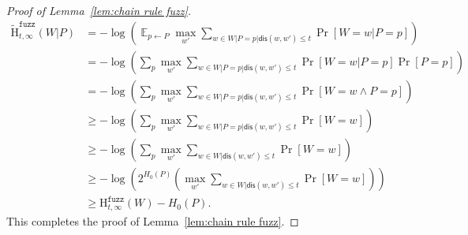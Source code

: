 \documentclass[11pt]{article}
\newcommand{\lemref}[1]{\mbox{Lemma~\ref{#1}}}
\DeclareMathOperator*{\expe}{\mathbb{E}}
\newcommand{\dis}{\ensuremath{\mathsf{dis}}}
\newcommand{\Hfuzz}{\mathrm{H}^{\mathtt{fuzz}}_{t,\infty}}
\newcommand{\Hfav}{\tilde{\mathrm{H}}^{\mathtt{fuzz}}_{t,\infty}}
\begin{document}
\begin{proof}[Proof of \lemref{lem:chain rule fuzz}]
\begin{align*}
\Hfav(W|P) &= -\log \left( \expe_{p\leftarrow P} \max_{w'} \sum_{w\in W |P =p | \dis(w, w')\le t} \Pr[W=w|P=p] \right)\\
&= -\log \left( \sum_{p} \max_{w'} \sum_{w\in W |P =p | \dis(w, w')\le t} \Pr[W=w|P=p]\Pr[P=p] \right)\\
&= -\log \left( \sum_{p} \max_{w'} \sum_{w\in W |P =p | \dis(w, w')\le t} \Pr[W=w \wedge P=p] \right)\\
&\ge -\log \left( \sum_{p} \max_{w'} \sum_{w\in W |P =p | \dis(w, w')\le t} \Pr[W=w] \right)\\
&\ge -\log \left( \sum_{p} \max_{w'} \sum_{w\in W | \dis(w, w')\le t} \Pr[W=w] \right)\\
&\ge -\log \left( 2^{H_0(P)} \left(\max_{w'} \sum_{w\in W | \dis(w, w')\le t} \Pr[W=w] \right)\right)\\
&\ge \Hfuzz(W) - H_0(P).
\end{align*}
This completes the proof of \lemref{lem:chain rule fuzz}.
\end{proof}



\end{document}

